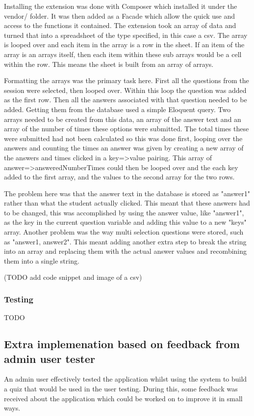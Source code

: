 Installing the extension was done with Composer which installed it under the vendor/ folder. It was then added as a Facade\cite{laravel-facades} which allow the quick use and access to the functions it contained. The extension took an array of data and turned that into a spreadsheet of the type specified, in this case a csv. The array is looped over and each item in the array is a row in the sheet. If an item of the array is an arrays itself, then each item within these sub arrays would be a cell within the row. This means the sheet is built from an array of arrays. 

Formatting the arrays was the primary task here. First all the questions from the session were selected, then looped over. Within this loop the question was added as the first row. Then all the answers associated with that question needed to be added. Getting them from the database used a simple Eloquent query. Two arrays needed to be created from this data, an array of the answer text and an array of the number of times these options were submitted. The total times these were submitted had not been calculated so this was done first, looping over the answers and counting the times an answer was given by creating a new array of the answers and times clicked in a key=>value pairing. This array of answer=>answeredNumberTimes could then be looped over and the each key added to the first array, and the values to the second array for the two rows.

The problem here was that the answer text in the database is stored as "answer1" rather than what the student actually clicked. This meant that these answers had to be changed, this was accomplished by using the answer value, like "answer1", as the key in the current question variable and adding this value to a new "keys" array. Another problem was the way multi selection questions were stored, such as "answer1, answer2". This meant adding another extra step to break the string into an array and replacing them with the actual answer values and recombining them into a single string.

(TODO add code snippet and image of a csv)
\subsubsection{Testing}
TODO
\newpage

\subsection{Extra implemenation based on feedback from admin user tester}
An admin user effectively tested the application whilst using the system to build a quiz that would be used in the user testing. During this, some feedback was received about the application which could be worked on to improve it in small ways.
